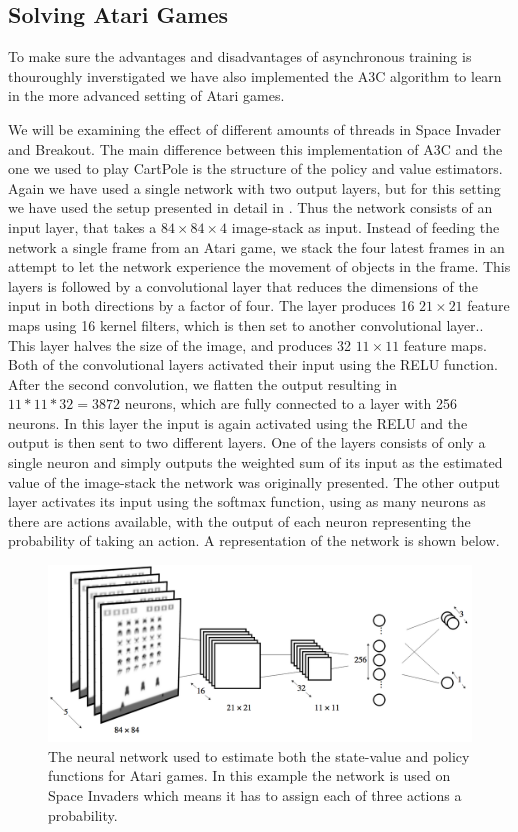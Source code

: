 \documentclass[11pt]{article}
\begin{document}
\subsection{Solving Atari Games}

To make sure the advantages and disadvantages of asynchronous training
is thouroughly inverstigated we have also implemented the A3C algorithm
to learn in the more advanced setting of Atari games.

We will be examining the effect of different amounts of threads
in Space Invader and Breakout.
The main difference between this implementation of A3C
and the one we used to play CartPole is the structure of the
policy and value estimators.
Again we have used a single network with two output layers,
but for this setting we have used the setup presented
in detail in \cite{dqn-nature}.
Thus the network consists of an input layer, that takes a $84 \times 84 \times 4$
image-stack as input.
Instead of feeding the network a single frame from an Atari game,
we stack the four latest frames in an attempt to let the network
experience the movement of objects in the frame.
This layers is followed by a convolutional layer that reduces the dimensions
of the input in both directions by a factor of four.
The layer produces 16 $21 \times 21$ feature maps using 16 kernel filters,
which is then set to another convolutional layer..
This layer halves the size of the image, and produces 32 $11 \times 11$
feature maps.
Both of the convolutional layers activated their input using the
RELU function.
After the second convolution, we flatten the output resulting in
$11 * 11 * 32 = 3872$ neurons, which are fully connected to
a layer with 256 neurons.
In this layer the input is again activated using the RELU and
the output is then sent to two different layers.
One of the layers consists of only a single neuron
and simply outputs the weighted sum of its input as the estimated value
of the image-stack the network was originally presented.
The other output layer activates its input using the softmax function,
using as many neurons as there are actions available, with the output of
each neuron representing the probability of taking an action.
A representation of the network is shown below.

\begin{figure}[H]
    \centering
    \includegraphics[scale=0.25]{include/Atari_network.png}
    \caption{The neural network used to estimate both the state-value
             and policy functions for Atari games. In this example the network
             is used on Space Invaders which means it has to assign each of three actions a probability.}
    \label{fig:atari_network}
\end{figure}
\end{document}
